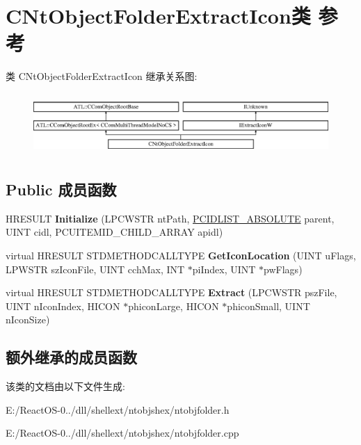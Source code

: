 \hypertarget{class_c_nt_object_folder_extract_icon}{}\section{C\+Nt\+Object\+Folder\+Extract\+Icon类 参考}
\label{class_c_nt_object_folder_extract_icon}
类 C\+Nt\+Object\+Folder\+Extract\+Icon 继承关系图\+:\begin{figure}[H]
\begin{center}
\leavevmode
\includegraphics[height=2.386364cm]{class_c_nt_object_folder_extract_icon}
\end{center}
\end{figure}
\subsection*{Public 成员函数}
\begin{DoxyCompactItemize}
\item 
\mbox{\label{class_c_nt_object_folder_extract_icon_aa0a6ae3ff83b24547eaaf20968a66ee6}} 
H\+R\+E\+S\+U\+LT {\bfseries Initialize} (L\+P\+C\+W\+S\+TR nt\+Path, \hyperlink{struct___i_t_e_m_i_d_l_i_s_t___a_b_s_o_l_u_t_e}{P\+C\+I\+D\+L\+I\+S\+T\+\_\+\+A\+B\+S\+O\+L\+U\+TE} parent, U\+I\+NT cidl, P\+C\+U\+I\+T\+E\+M\+I\+D\+\_\+\+C\+H\+I\+L\+D\+\_\+\+A\+R\+R\+AY apidl)
\item 
\mbox{\label{class_c_nt_object_folder_extract_icon_a63238ddc80da8a60c387039c9c641a37}} 
virtual H\+R\+E\+S\+U\+LT S\+T\+D\+M\+E\+T\+H\+O\+D\+C\+A\+L\+L\+T\+Y\+PE {\bfseries Get\+Icon\+Location} (U\+I\+NT u\+Flags, L\+P\+W\+S\+TR sz\+Icon\+File, U\+I\+NT cch\+Max, I\+NT $\ast$pi\+Index, U\+I\+NT $\ast$pw\+Flags)
\item 
\mbox{\label{class_c_nt_object_folder_extract_icon_a72a815359f3092c4e3e5511df6fb81b6}} 
virtual H\+R\+E\+S\+U\+LT S\+T\+D\+M\+E\+T\+H\+O\+D\+C\+A\+L\+L\+T\+Y\+PE {\bfseries Extract} (L\+P\+C\+W\+S\+TR psz\+File, U\+I\+NT n\+Icon\+Index, H\+I\+C\+ON $\ast$phicon\+Large, H\+I\+C\+ON $\ast$phicon\+Small, U\+I\+NT n\+Icon\+Size)
\end{DoxyCompactItemize}
\subsection*{额外继承的成员函数}


该类的文档由以下文件生成\+:\begin{DoxyCompactItemize}
\item 
E\+:/\+React\+O\+S-\/0../dll/shellext/ntobjshex/ntobjfolder.\+h\item 
E\+:/\+React\+O\+S-\/0../dll/shellext/ntobjshex/ntobjfolder.\+cpp\end{DoxyCompactItemize}
